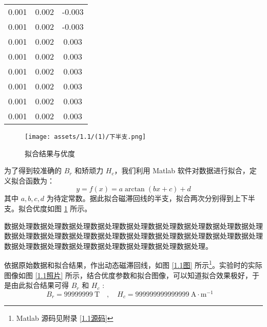 \documentclass[UTF8]{article}
\theoremstyle{MyLineTheoremStyle} %
\theoremstyle{MyBlockTheoremStyle} %
\theoremstyle{MySubsubsectionStyle} %
\begin{document}
\begin{center}
\begin{minipage}{0.35\columnwidth}
\begin{table}[H]
\begin{tabular}{ccc}
0.001 & 0.002 &-0.003 \\
0.001 & 0.002 &-0.003 \\
0.001 & 0.002 & 0.003 \\
0.001 & 0.002 & 0.003 \\
0.001 & 0.002 & 0.003 \\
0.001 & 0.002 & 0.003 \\
0.001 & 0.002 & 0.003 \\
0.001 & 0.002 & 0.003 \\
\bottomrule
    \end{tabular}
\end{table}
\end{minipage}
\begin{minipage}{0.24\columnwidth}
\begin{figure}[H]\centering
\texttt{[image: assets/1.1/(1)/下半支.png]}
\caption{拟合结果与优度}\label{1.1拟合优度}
\end{figure}
\end{minipage}
\end{center}


为了得到较准确的 $B_r$ 和矫顽力 $H_c$，我们利用 Matlab 软件对数据进行拟合，定义拟合函数为：
\begin{equation}
y = f(x) = a \arctan (b x + c) + d
\end{equation}
其中 $a, b, c, d$ 为待定常数。据此拟合磁滞回线的半支，拟合两次分别得到上下半支。拟合优度如图 \ref{1.1拟合优度} 所示。

数据处理数据处理数据处理数据处理数据处理数据处理数据处理数据处理数据处理数据处理数据处理数据处理数据处理数据处理数据处理数据处理数据处理数据处理数据处理数据处理数据处理数据处理数据处理数据处理数据处理。


依据原始数据和拟合结果，作出动态磁滞回线，如图 \ref{1.1图} 所示\footnote{Matlab 源码见附录 \ref{1.1源码}}。实验时的实际图像如图 \ref{1.1照片} 所示，结合优度参数和拟合图像，可以知道拟合效果极好，于是由此拟合结果可得 $B_r$ 和 $H_c$ :
\begin{equation}
    B_r = 99999999 \ \mathrm{T}\quad ,\quad H_c = 999999999999999 \ \mathrm{A\cdot m^{-1}}\quad
\end{equation}
\end{document}
